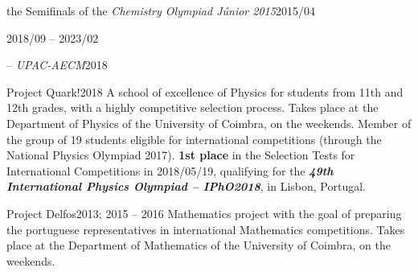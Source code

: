 \documentclass{cv}
\newif\ifen
\newif\ifpt
\newcommand{\en}[1]{\ifen#1\fi}
\newcommand{\pt}[1]{\ifpt#1\fi}
\begin{document}
\begin{jobopt}{\en{Participation in} the Semifinals of the \textit{Chemistry Olympiad Júnior 2015}}{2015/04}
\begin{job}{\en{FEUP-SWERC community}}{2018/09 -- 2023/02}
    \pt{Comunidade colaborativa de estudantes e professores da Faculdade de Engenharia da Universidade do Porto, com o objetivo de incentivar a programação competitiva na comunidade FEUP, promovendo competições de programação e selecionando/preparando os estudantes da FEUP para competições de programação nacionais, europeias e internacionais.}
\end{job}
\begin{jobopt}{\en{Schools Participatory Budget} -- \en{Proposal} \textit{UPAC-AECM}}{2018}
    \en{Second proponent of proposal UPAC-AECM, consisting of the installation of a Self-Consumption Unit, made of a set of photovoltaic panels, in Castêlo da Maia Secondary School. Winning proposal of the election held on 2018/03/23, by absolute majority (50.3\% of valid votes).}
    \pt{2º proponente da proposta UPAC-AECM, consistindo da instalação de uma Unidade de Auto-Consumo, constituída por um conjunto de painéis solares, na Escola Secundária do Castêlo da Maia. Proposta vencedora da eleição realizada a 2018/03/23.}
\end{jobopt}
\begin{jobopt}{Project Quark!}{2018}
    A school of excellence of Physics for students from 11th and 12th grades, with a highly competitive selection process. Takes place at the Department of Physics of the University of Coimbra, on the weekends. Member of the group of 19 students eligible for international competitions (through the National Physics Olympiad 2017). \textbf{1st place} in the Selection Tests for International Competitions in 2018/05/19, qualifying for the \textbf{\textit{49th International Physics Olympiad -- IPhO2018}}, in Lisbon, Portugal.
\end{jobopt}
\begin{jobopt}{Project Delfos}{2013; 2015 -- 2016}
    Mathematics project with the goal of preparing the portuguese representatives in international Mathematics competitions. Takes place at the Department of Mathematics of the University of Coimbra, on the weekends.
\end{jobopt}

\optional{
}
\end{jobopt}
\end{document}
